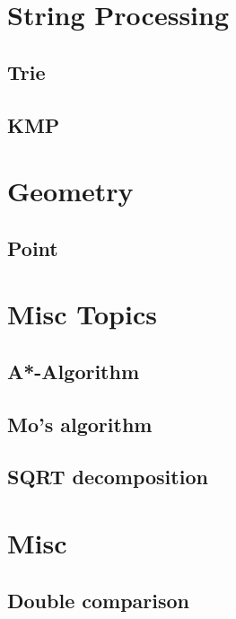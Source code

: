 \section{String Processing}
\subsection{Trie}
\raggedbottom
\hrulefill
\subsection{KMP}
\raggedbottom
\hrulefill


\section{Geometry}
\subsection{Point}
\raggedbottom
\hrulefill


\section{Misc Topics}
\subsection{A*-Algorithm}
\raggedbottom
\hrulefill
\subsection{Mo's algorithm}
\raggedbottom
\hrulefill
\subsection{SQRT decomposition}
\raggedbottom
\hrulefill


\section{Misc}
\subsection{Double comparison}
\raggedbottom
\hrulefill
